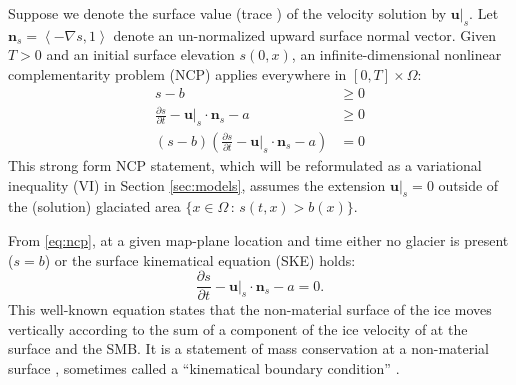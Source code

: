 \documentclass[hidelinks,onefignum,onetabnum,final]{siamart220329}  %
\newcommand{\grad}{\nabla}
\newcommand{\bn}{\mathbf{n}}
\newcommand{\bu}{\mathbf{u}}
\begin{document}
Suppose we denote the surface value (trace \cite{Evans2010}) of the velocity solution by $\bu|_s$.  Let $\bn_s = \left<-\grad s,1\right>$ denote an un-normalized upward surface normal vector.  Given $T>0$ and an initial surface elevation $s(0,x)$, an infinite-dimensional nonlinear complementarity problem (NCP) \cite{Bueler2021conservation,FacchineiPang2003,SchoofHewitt2013} applies everywhere in $[0,T]\times \Omega$:
\begin{subequations}
\label{eq:ncp}
\begin{align}
s - b &\ge 0 \\
\frac{\partial s}{\partial t} - \bu|_s \cdot \bn_s - a &\ge 0 \\
(s - b) \left(\frac{\partial s}{\partial t} - \bu|_s \cdot \bn_s - a\right) &= 0
\end{align}
\end{subequations}
This strong form NCP statement, which will be reformulated as a variational inequality (VI) \cite{KinderlehrerStampacchia1980} in Section \ref{sec:models}, assumes the extension $\bu|_s=0$ outside of the (solution) glaciated area $\{x\in\Omega\,:\,s(t,x)>b(x)\}$.

From \eqref{eq:ncp}, at a given map-plane location and time either no glacier is present ($s=b$) or the surface kinematical equation (SKE) holds:
\begin{equation}
\frac{\partial s}{\partial t} - \bu|_s \cdot \bn_s - a = 0.  \label{eq:ske}
\end{equation}
This well-known equation \cite{SchoofHewitt2013} states that the non-material surface of the ice moves vertically according to the sum of a component of the ice velocity of at the surface and the SMB.  It is a statement of mass conservation at a non-material surface \cite{Aschwandenetal2012}, sometimes called a ``kinematical boundary condition'' \cite{GreveBlatter2009}.
\end{document}
